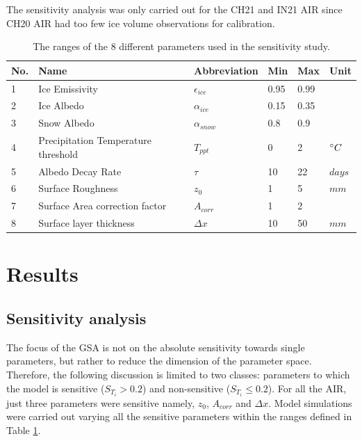 \documentclass[utf8]{frontiersSCNS} %
\begin{document}
The sensitivity analysis was only carried out for the CH21 and IN21 AIR since CH20 AIR had too few ice volume
observations for calibration.

\begin{table}
	\centering
	\caption{The ranges of the 8 different parameters used in the sensitivity study.}
	\label{tab:parameters}
	\begin{tabular}{@{}llllll@{}}
		\toprule
		\textbf{No.} & \textbf{Name}                       & \textbf{Abbreviation} & \textbf{Min} & \textbf{Max} & \textbf{Unit} \\\midrule
		1            & Ice Emissivity                      & $\epsilon_{ice}$      & 0.95         & 0.99         &               \\
		2            & Ice Albedo                          & $\alpha_{ice}$        & 0.15         & 0.35         &               \\
		3            & Snow Albedo                         & $\alpha_{snow}$       & 0.8          & 0.9          &               \\
		4            & Precipitation Temperature threshold & $T_{ppt}$             & 0            & 2            & $\degree C$   \\
		5            & Albedo Decay Rate                   & $\tau$                & 10           & 22           & $days$        \\
		6            & Surface Roughness                   & $z_0$                 & 1            & 5            & $mm$          \\
		7            & Surface Area correction factor      & $A_{corr}$            & 1            & 2            &               \\
		8            & Surface layer thickness             & $\Delta x$            & 10           & 50           & $mm$          \\\bottomrule
	\end{tabular}
\end{table}

\section{Results}

\subsection{Sensitivity analysis}

The focus of the GSA is not on the absolute sensitivity towards single parameters, but rather to reduce the dimension
of the parameter space. Therefore, the following discussion is limited to two classes: parameters to which the model is
sensitive ($S_{T_{i}} > 0.2$) and non-sensitive ($S_{T_{i}} \leq 0.2$). For all the AIR, just three parameters were sensitive namely, $z_{0}$, $A_{corr}$ and $\Delta x$. Model simulations
were carried out varying all the sensitive parameters within the ranges defined in Table \ref{tab:parameters}.
\end{document}
